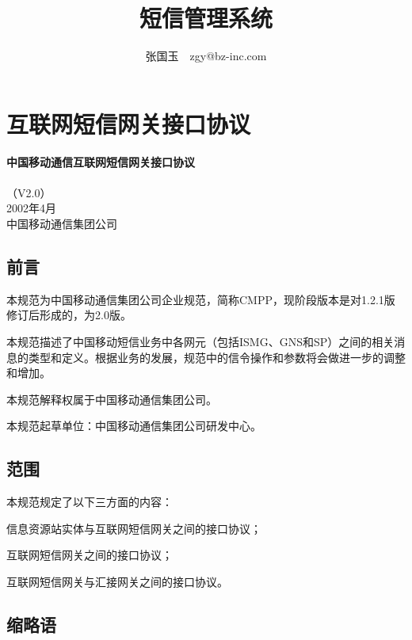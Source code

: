 \documentclass[11pt]{book} %
\title{短信管理系统}
\author{张国玉~~zgy@bz-inc.com}
\begin{document}
\maketitle
\tableofcontents
\listoffigures
\listoftables
\printindex




\part{互联网短信网关接口协议}

\begin{center}
\textbf{\huge 中国移动通信互联网短信网关接口协议}\\ \bigskip \bigskip {} \\ {\large（V2.0）} \bigskip \\ \bigskip 2002年4月\\ \vfill 中国移动通信集团公司
\end{center}

\chapter{前言}

本规范为中国移动通信集团公司企业规范，简称CMPP，现阶段版本是对1.2.1版修订后形成的，为2.0版。

本规范描述了中国移动短信业务中各网元（包括ISMG、GNS和SP）之间的相关消息的类型和定义。根据业务的发展，规范中的信令操作和参数将会做进一步的调整和增加。

本规范解释权属于中国移动通信集团公司。

本规范起草单位：中国移动通信集团公司研发中心。


\chapter{范围}

本规范规定了以下三方面的内容：

\begin{compactenum}
\item 信息资源站实体与互联网短信网关之间的接口协议；
\item 互联网短信网关之间的接口协议；
\item 互联网短信网关与汇接网关之间的接口协议。
\end{compactenum}


\chapter{缩略语}
\end{document}
